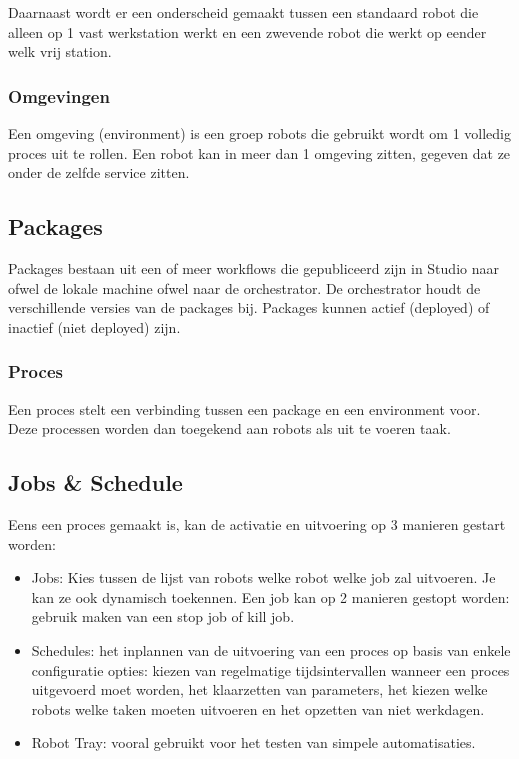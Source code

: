 Daarnaast wordt er een onderscheid gemaakt tussen een standaard robot die alleen op 1 vast werkstation werkt en een zwevende robot die werkt op eender welk vrij station.

\subsubsection{Omgevingen}
Een omgeving (environment) is een groep robots die gebruikt wordt om 1 volledig proces uit te rollen. Een robot kan in meer dan 1 omgeving zitten, gegeven dat ze onder de zelfde service zitten.

\subsection{Packages}
Packages bestaan uit een of meer workflows die gepubliceerd zijn in Studio naar ofwel de lokale machine ofwel naar de orchestrator. De orchestrator houdt de verschillende versies van de packages bij. Packages kunnen actief (deployed) of inactief (niet deployed) zijn.

\subsubsection{Proces}
Een proces stelt een verbinding tussen een package en een environment voor. Deze processen worden dan toegekend aan robots als uit te voeren taak.

\subsection{Jobs \& Schedule}
Eens een proces gemaakt is, kan de activatie en uitvoering op 3 manieren gestart worden:
\begin{itemize}
	\item Jobs: Kies tussen de lijst van robots welke robot welke job zal uitvoeren. Je kan ze ook dynamisch toekennen. Een job kan op 2 manieren gestopt worden: gebruik maken van een stop job of kill job.
	\item Schedules: het inplannen van de uitvoering van een proces op basis van enkele configuratie opties: kiezen van regelmatige tijdsintervallen wanneer een proces uitgevoerd moet worden, het klaarzetten van parameters, het kiezen welke robots welke taken moeten uitvoeren en het opzetten van niet werkdagen.
	\item Robot Tray: vooral gebruikt voor het testen van simpele automatisaties.
\end{itemize}

